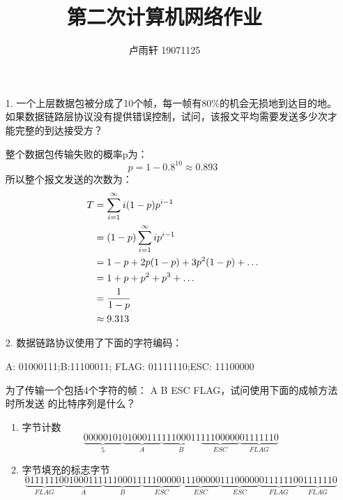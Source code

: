 \documentclass{ctexart}
\title{第二次计算机网络作业}
\author{卢雨轩 19071125}
\DeclarePairedDelimiter{\paren}{(}{)}
\begin{document}
\maketitle

\begin{itemize}
    \item[1.] 一个上层数据包被分成了10个帧，每一帧有80\%的机会无损地到达目的地。
    如果数据链路层协议没有提供错误控制，试问，该报文平均需要发送多少次才能完整的到达接受方？

    整个数据包传输失败的概率p为：
    \begin{equation*}
        p = 1 - 0.8^{10} \approx 0.893
    \end{equation*}
    所以整个报文发送的次数为：
    \begin{align*}
        T & = \sum_{i=1}^{\infty}i\paren{1-p}p^{i-1} \\
          & = (1-p)\sum_{i=1}^{\infty}ip^{i-1} \\
          & = 1-p + 2p(1-p) + 3p^2(1-p) + \dots \\
          & = 1 + p + p^2 + p^3 + \dots \\
          & = \frac{1}{1-p} \\
          & \approx 9.313
    \end{align*}
    \item[2.] 数据链路协议使用了下面的字符编码：
    \begin{center}
        A: 01000111;\quad B:11100011; 
        \quad FLAG: 01111110;\quad ESC: 11100000
    \end{center} 
    为了传输一个包括4个字符的帧： A B ESC FLAG，试问使用下面的成帧方法时所发送
    的比特序列是什么？
    \begin{enumerate}
        \item 字节计数
        \begin{equation*}
            \underbrace{0000 0101}_{5}
            \underbrace{01000111}_A
            \underbrace{11100011}_B
            \underbrace{11100000}_{ESC}
            \underbrace{01111110}_{FLAG}
        \end{equation*}
        \item 字节填充的标志字节
        \begin{equation*}
            \underbrace{01111110}_{FLAG}
            \underbrace{01000111}_A
            \underbrace{11100011}_B
            \underbrace{11100000}_{ESC}
            \underbrace{11100000}_{ESC}
            \underbrace{11100000}_{ESC}
            \underbrace{01111110}_{FLAG}
            \underbrace{01111110}_{FLAG}

\end{equation*}
\end{enumerate}
\end{itemize}
\end{document}
